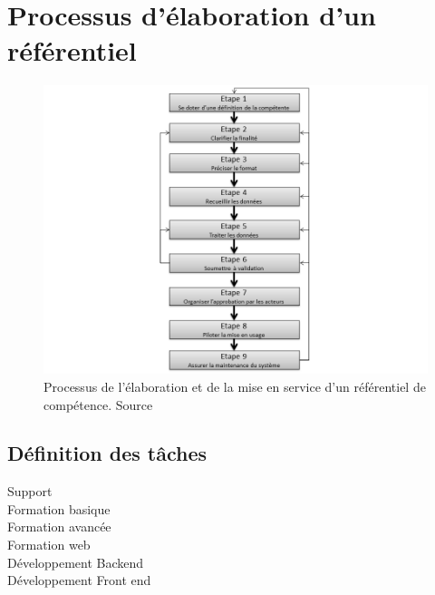 \chapter{Processus d'élaboration d'un référentiel}

\begin{figure}[h!]
    \begin{center}
        \includegraphics[scale=0.5]{document/process.png}
        \caption{Processus de l'élaboration et de la mise en service d'un référentiel de compétence. Source \citep[pp.41]{refcompetence} }
        \label{process}
    \end{center}
\end{figure}






\section{Définition des tâches}

\begin{description}
    \item[Support] 
    \item[Formation basique]
    \item[Formation avancée]
    \item[Formation web]
    \item[Développement Backend]
    \item[Développement Front end]
    
\end{description}

